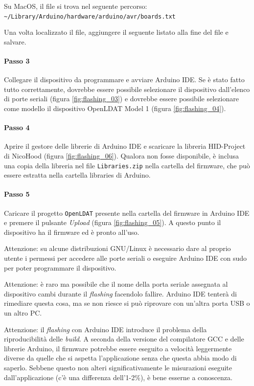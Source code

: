 Su MacOS, il file si trova nel seguente percorso:\\
	\texttt{\textasciitilde/Library/Arduino/hardware/arduino/avr/boards.txt}

Una volta localizzato il file, aggiungere il seguente listato alla fine del file e salvare.


\paragraph{Passo 3} Collegare il dispositivo da programmare e avviare Arduino IDE. Se è stato fatto tutto correttamente, dovrebbe essere possibile selezionare il dispositivo dall'elenco di porte seriali (figura \ref{fig:flashing_03}) e dovrebbe essere possibile selezionare come modello il dispositivo OpenLDAT Model 1 (figura \ref{fig:flashing_04}).

\paragraph{Passo 4} Aprire il gestore delle librerie di Arduino IDE e scaricare la libreria HID-Project di NicoHood (figura \ref{fig:flashing_06}). Qualora non fosse disponibile, è inclusa una copia della libreria nel file \texttt{Libraries.zip} nella cartella del firmware, che può essere estratta nella cartella libraries di Arduino.

\paragraph{Passo 5} Caricare il progetto \texttt{OpenLDAT} presente nella cartella del firmware in Arduino IDE e premere il pulsante \textit{Upload} (figura \ref{fig:flashing_05}). A questo punto il dispositivo ha il firmware ed è pronto all'uso.

Attenzione: su alcune distribuzioni GNU/Linux è necessario dare al proprio utente i permessi per accedere alle porte seriali o eseguire Arduino IDE con sudo per poter programmare il dispositivo.

Attenzione: è raro ma possibile che il nome della porta seriale assegnata al dispositivo cambi durante il \textit{flashing} facendolo fallire. Arduino IDE tenterà di rimediare questa cosa, ma se non riesce si può riprovare con un'altra porta USB o un altro PC.

Attenzione: il \textit{flashing} con Arduino IDE introduce il problema della riproducibilità delle \textit{build}. A seconda della versione del compilatore GCC e delle librerie Arduino, il firmware potrebbe essere eseguito a velocità leggermente diverse da quelle che si aspetta l'applicazione senza che questa abbia modo di saperlo. Sebbene questo non alteri significativamente le misurazioni eseguite dall'applicazione (c'è una differenza dell'1-2\%), è bene esserne a conoscenza.

